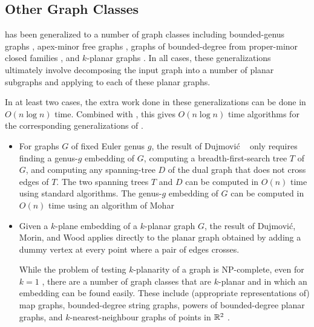 \documentclass[kpfonts]{patmorin}
\begin{document}
\subsection{Other Graph Classes}

 has been generalized to a number of graph classes including bounded-genus graphs \cite{dujmovic.joret.ea:planar}, apex-minor free graphs \cite{dujmovic.joret.ea:planar}, graphs of bounded-degree from proper-minor closed families \cite{dujmovic.esperet.ea:planar}, and $k$-planar graphs \cite{dujmovic.morin.ea:structure}.  In all cases, these generalizations ultimately involve decomposing the input graph into a number of planar subgraphs and applying  to each of these planar graphs.

In at least two cases, the extra work done in these generalizations can be done in $O(n\log n)$ time.  Combined with , this gives $O(n\log n)$ time algorithms for the corresponding generalizations of .

\begin{itemize}
  \item For graphs $G$ of fixed Euler genus $g$, the result of Dujmović \etal\ \cite{dujmovic.joret.ea:planar} only requires finding a genus-$g$ embedding of $G$, computing a breadth-first-search tree $T$ of $G$, and computing any spanning-tree $D$ of the dual graph that does not cross edges of $T$.  The two spanning trees $T$ and $D$ can be computed in $O(n)$ time using standard algorithms.  The genus-$g$ embedding of $G$ can be computed in $O(n)$ time using an algorithm of Mohar \cite{mohar:linear}

  \item Given a $k$-plane embedding of a $k$-planar graph $G$, the result of Dujmović, Morin, and Wood \cite{dujmovic.morin.ea:structure} applies  directly to the planar graph obtained by adding a dummy vertex at every point where a pair of edges crosses.

  While the problem of testing $k$-planarity of a graph is NP-complete, even for $k=1$ \cite{grigoriev.bodlaender:algorithms,korzhik.mohar:minimal,urschel.wellens:testing}, there are a number of graph classes that are $k$-planar and in which an embedding can be found easily.  These include (appropriate representations of) map graphs, bounded-degree string graphs, powers of bounded-degree planar graphs, and $k$-nearest-neighbour graphs of points in $\mathbb{R}^2$ \cite[Section~8]{dujmovic.morin.ea:structure}.
\end{itemize}
\end{document}
